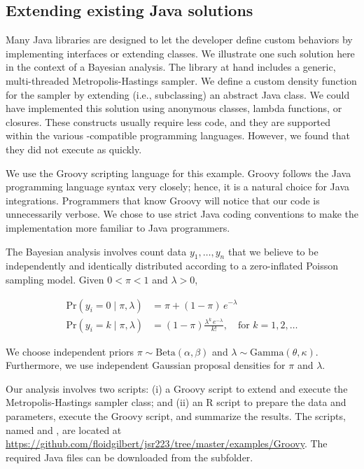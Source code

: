 \hypertarget{extending-existing-java-solutions}{}
\subsection{Extending existing Java solutions}

Many Java libraries are designed to let the developer define custom behaviors by implementing interfaces or extending classes. We illustrate one such solution here in the context of a Bayesian analysis. The library at hand includes a generic, multi-threaded Metropolis-Hastings sampler. We define a custom density function for the sampler by extending (i.e., subclassing) an abstract Java class. We could have implemented this solution using anonymous classes, lambda functions, or closures. These constructs usually require less code, and they are supported within the various -compatible programming languages. However, we found that they did not execute as quickly.

We use the Groovy scripting language for this example. Groovy follows the Java programming language syntax very closely; hence, it is a natural choice for Java integrations. Programmers that know Groovy will notice that our code is unnecessarily verbose. We chose to use strict Java coding conventions to make the implementation more familiar to Java programmers.

The Bayesian analysis involves count data $y_1,\dots,y_n$ that we believe to be independently and identically distributed according to a zero-inflated Poisson sampling model. Given $0 < \pi < 1$ and $\lambda > 0$,

\begin{align*}
\text{Pr}(y_i = 0 \mid \pi, \lambda) &= \pi + (1-\pi) \, e^{-\lambda} \\
\text{Pr}(y_i = k \mid \pi, \lambda) &= (1  -\pi) \frac{\lambda^k \, e^{-\lambda}}{k!}, \quad \text{for } k = 1, 2, \ldots
\end{align*}

We choose independent priors $\pi \sim \text{Beta}(\alpha,\beta)$ and $\lambda \sim \text{Gamma}(\theta,\kappa)$. Furthermore, we use independent Gaussian proposal densities for $\pi$ and $\lambda$.

Our analysis involves two scripts: (i) a Groovy script to extend and execute the Metropolis-Hastings sampler class; and (ii) an R script to prepare the data and parameters, execute the Groovy script, and summarize the results. The scripts, named  and , are located at \url{https://github.com/floidgilbert/jsr223/tree/master/examples/Groovy}. The required Java files can be downloaded from the  subfolder.

